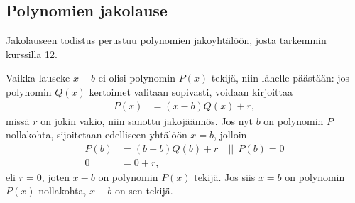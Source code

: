 \subsection*{Polynomien jakolause}
\label{tod:poljako}

%
% 

Jakolauseen todistus perustuu polynomien jakoyhtälöön, josta tarkemmin kurssilla 12.

\begin{todistus}
Vaikka lauseke $x-b$ ei olisi polynomin $P(x)$ tekijä, niin lähelle päästään: jos polynomin $Q(x)$ kertoimet valitaan sopivasti, voidaan kirjoittaa
\begin{align*}
P(x)&=(x-b)Q(x)+r,
\end{align*}
missä $r$ on jokin vakio, niin sanottu jakojäännös. Jos nyt $b$ on polynomin $P$ nollakohta, sijoitetaan edelliseen yhtälöön $x=b$, jolloin
\begin{align*}
P(b)&=(b-b)Q(b)+r \quad || \ \ P(b)=0 \\
0&=0+r,
\end{align*}
eli $r=0$, joten $x-b$ on polynomin $P(x)$ tekijä. Jos siis $x=b$ on polynomin $P(x)$ nollakohta, $x-b$ on sen tekijä.
\end{todistus}
